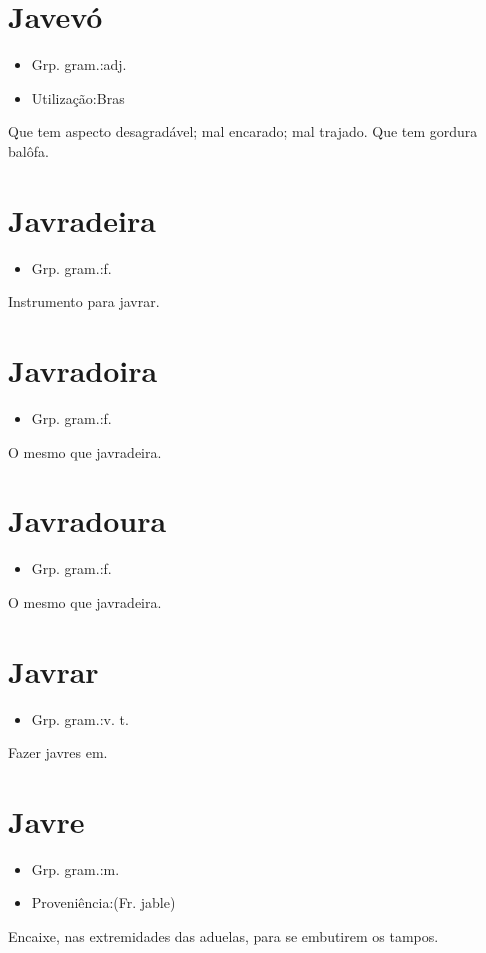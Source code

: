 \documentclass{article}
\begin{document}
\section{Javevó}
\begin{itemize}
\item {Grp. gram.:adj.}
\end{itemize}
\begin{itemize}
\item {Utilização:Bras}
\end{itemize}
Que tem aspecto desagradável; mal encarado; mal trajado.
Que tem gordura balôfa.
\section{Javradeira}
\begin{itemize}
\item {Grp. gram.:f.}
\end{itemize}
Instrumento para javrar.
\section{Javradoira}
\begin{itemize}
\item {Grp. gram.:f.}
\end{itemize}
O mesmo que \textunderscore javradeira\textunderscore .
\section{Javradoura}
\begin{itemize}
\item {Grp. gram.:f.}
\end{itemize}
O mesmo que \textunderscore javradeira\textunderscore .
\section{Javrar}
\begin{itemize}
\item {Grp. gram.:v. t.}
\end{itemize}
Fazer javres em.
\section{Javre}
\begin{itemize}
\item {Grp. gram.:m.}
\end{itemize}
\begin{itemize}
\item {Proveniência:(Fr. \textunderscore jable\textunderscore )}
\end{itemize}
Encaixe, nas extremidades das aduelas, para se embutirem os tampos.
\end{document}
